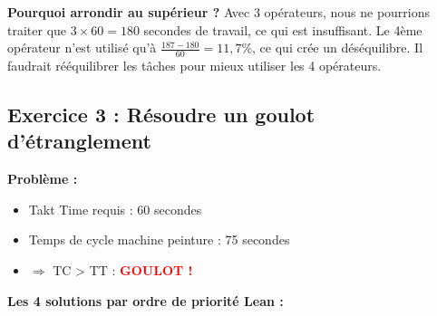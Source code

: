 \documentclass[12pt,a4paper]{article}
\begin{document}
\begin{tcolorbox}[pedagogique]
\textbf{Pourquoi arrondir au supérieur ?} Avec 3 opérateurs, nous ne pourrions traiter que $3 \times 60 = 180$ secondes de travail, ce qui est insuffisant. Le 4ème opérateur n'est utilisé qu'à $\frac{187-180}{60} = 11{,}7\%$, ce qui crée un déséquilibre. Il faudrait rééquilibrer les tâches pour mieux utiliser les 4 opérateurs.
\end{tcolorbox}

\subsection{Exercice 3 : Résoudre un goulot d'étranglement}

\textbf{Problème :}
\begin{itemize}
    \item Takt Time requis : 60 secondes
    \item Temps de cycle machine peinture : 75 secondes
    \item $\Rightarrow$ TC > TT : \textcolor{red}{\textbf{GOULOT !}}
\end{itemize}

\textbf{Les 4 solutions par ordre de priorité Lean :}
\end{document}
